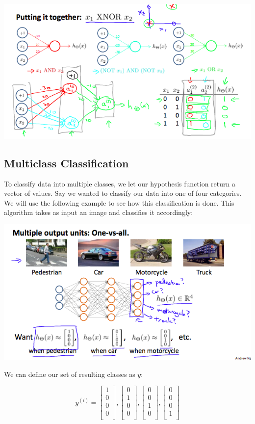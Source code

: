 \documentclass[UTF8]{article}
\begin{document}
\includegraphics[width = .8\textwidth]{NotePics/8_4_1.png}

\subsection{Multiclass Classification}

To classify data into multiple classes, we let our hypothesis function return a vector of values. Say we wanted to classify our data into one of four categories. We will use the following example to see how this classification is done. This algorithm takes as input an image and classifies it accordingly:

\includegraphics[width = .8\textwidth]{NotePics/8_5_1.png}

We can define our set of resulting classes as $y$:

$$y^{(i)} =\begin{bmatrix}1 \\ 0 \\ 0 \\ 0 \\\end{bmatrix},\begin{bmatrix}0 \\ 1 \\ 0 \\ 0 \\\end{bmatrix},\begin{bmatrix}0 \\ 0 \\ 1 \\ 0 \\\end{bmatrix},\begin{bmatrix}0 \\ 0 \\ 0 \\ 1 \\\end{bmatrix}$$
\end{document}
